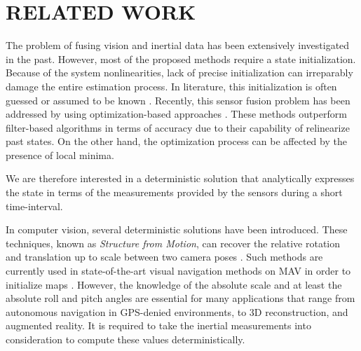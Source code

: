 \documentclass[letterpaper, 10 pt, conference]{ieeeconf}  %
\begin{document}
\section{RELATED WORK}

The problem of fusing vision and inertial data has been extensively investigated in the past.
However, most of the proposed methods require a state initialization.
Because of the system nonlinearities, lack of precise initialization can irreparably damage the entire estimation process.
In literature, this initialization is often guessed or assumed to be known \cite{Armesto2007}\cite{Li2013}\cite{Huang2009}\cite{Bibuli2007}\cite{Forster2014}. Recently, this sensor fusion problem has been addressed by using optimization-based approaches \cite{Leute2014}\cite{Forster2015}. These methods outperform filter-based algorithms in terms of accuracy due to their capability of relinearize past states. On the other hand, the optimization process can be affected by the presence of local minima.

We are therefore interested in a deterministic solution that analytically expresses the state in terms of the measurements provided by the sensors during a short time-interval.

In computer vision, several deterministic solutions have been introduced.
These techniques, known as {\it Structure from Motion}, can recover the relative rotation and translation up to scale between two camera poses \cite{Longuet-Higgins1981}\cite{Hartley1997}\cite{Nister2003}\cite{Hartley2004}\cite{Li2006}.
Such methods are currently used in state-of-the-art visual navigation methods on MAV in order to initialize maps \cite{Weiss2012}\cite{Forster2014}.
However, the knowledge of the absolute scale and at least the absolute roll and pitch angles are essential for many applications that range from autonomous navigation in GPS-denied environments, to 3D reconstruction, and augmented reality.
It is required to take the inertial measurements into consideration to compute these values deterministically.

\end{document}
